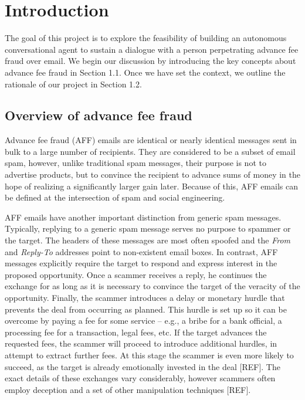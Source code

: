 \chapter{Introduction}
The goal of this project is to explore the feasibility of building an autonomous conversational agent to sustain a dialogue with a person perpetrating advance fee fraud over email. We begin our discussion by introducing the key concepts about advance fee fraud in Section 1.1. Once we have set the context, we outline the rationale of our project in Section 1.2.

\section{Overview of advance fee fraud}
Advance fee fraud (AFF) emails are identical or nearly identical messages sent in bulk to a large number of recipients. They are considered to be a subset of email spam, however, unlike traditional spam messages, their purpose is not to advertise products, but to convince the recipient to advance sums of money in the hope of realizing a significantly larger gain later. Because of this, AFF emails can be defined at the intersection of spam and social engineering.

AFF emails have another important distinction from generic spam messages. Typically, replying to a generic spam message serves no purpose to spammer or the target. The headers of these messages are most often spoofed and the \emph{From} and \emph{Reply-To} addresses point to non-existent email boxes. In contrast, AFF messages explicitly require the target to respond and express interest in the proposed opportunity. Once a scammer receives a reply, he continues the exchange for as long as it is necessary to convince the target of the veracity of the opportunity. Finally, the scammer introduces a delay or monetary hurdle that prevents the deal from occurring as planned. This hurdle is set up so it can be overcome by paying a fee for some service -- e.g., a bribe for a bank official, a processing fee for a transaction, legal fees, etc. If the target advances the requested fees, the scammer will proceed to introduce additional hurdles, in attempt to extract further fees. At this stage the scammer is even more likely to succeed, as the target is already emotionally invested in the deal [REF]. The exact details of these exchanges vary considerably, however scammers often employ deception and a set of other manipulation techniques [REF].

